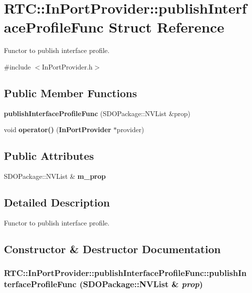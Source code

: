 \section{RTC::InPortProvider::publishInterfaceProfileFunc Struct Reference}
\label{structRTC_1_1InPortProvider_1_1publishInterfaceProfileFunc}


Functor to publish interface profile.  




{\ttfamily \#include $<$InPortProvider.h$>$}

\subsection*{Public Member Functions}
\begin{DoxyCompactItemize}
\item 
{\bf publishInterfaceProfileFunc} (SDOPackage::NVList \&prop)
\item 
void {\bf operator()} ({\bf InPortProvider} $\ast$provider)
\end{DoxyCompactItemize}
\subsection*{Public Attributes}
\begin{DoxyCompactItemize}
\item 
SDOPackage::NVList \& {\bf m\_\-prop}
\end{DoxyCompactItemize}


\subsection{Detailed Description}
Functor to publish interface profile. 

\subsection{Constructor \& Destructor Documentation}
\subsubsection[{publishInterfaceProfileFunc}]{\setlength{\rightskip}{0pt plus 5cm}RTC::InPortProvider::publishInterfaceProfileFunc::publishInterfaceProfileFunc (SDOPackage::NVList \& {\em prop})\hspace{0.3cm}{\ttfamily  [inline]}}\label{structRTC_1_1InPortProvider_1_1publishInterfaceProfileFunc_a44152ee251252826d013c08af31b178b}


